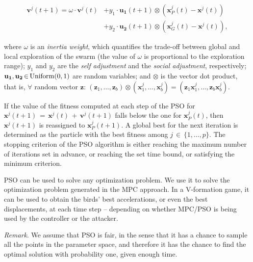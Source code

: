 \vspace*{-4mm}
\begin{align}
\mathbf{v}^j(t+1) = \omega\cdot\mathbf{v}^j(t) &+ y_1\cdot \mathbf{u_1}(t+1)\otimes(\mathbf{x}_{P}^j(t)-\mathbf{x}^j(t))  \nonumber \\
&+ y_2\cdot \mathbf{u_2}(t+1)\otimes(\mathbf{x}_{G}^j(t)-\mathbf{x}^j(t)),
\label{eq:swarm}
\end{align}

\vspace*{-1mm}\noindent{}where $\omega$ is an \emph{inertia weight}, which quantifies the trade-off between global and local exploration of the swarm (the value of $\omega$ is proportional to the exploration range); $y_1$ and $y_2$ are the \emph{self adjustment} and the \emph{social adjustment}, respectively; $\mathbf{u_1},\mathbf{u_2}\,{\in}\,{\rm Uniform}(0,1)$ are random variables; and $\otimes$ is the vector dot product, that is, $\forall$ random vector $\mathbf{z}$: $(\mathbf{z}_1,\ldots,\mathbf{z}_b)\otimes(\mathbf{x}_1^j,\ldots,\mathbf{x}_b^j)=(\mathbf{z}_1\mathbf{x}_1^j,\ldots,\mathbf{z}_b\mathbf{x}_b^j)$.


If the value of the fitness computed at each step of the PSO
for $\mathbf{x}^j(t+1)\,{=}\,\mathbf{x}^j(t)\,{+}\,\mathbf{v}^j(t+1)$ falls below the one for $\mathbf{x}_{P}^j(t)$, then $\mathbf{x}^j(t+1)$ is reassigned to $\mathbf{x}_{P}^j(t+1)$. A global best for the next iteration is determined as the particle with the best fitness among $j\,{\in}\,\{1,\ldots,p\}$. The stopping criterion of the PSO algorithm is either reaching the maximum number of iterations set in advance, or reaching the set time bound, or satisfying the minimum criterion. 

PSO can be used to solve any optimization problem. We use it to solve the optimization problem generated in the MPC approach. In a V-formation game, it can be used to obtain the birds' best accelerations, or even the best displacements, at each time step -- depending on whether MPC/PSO is being used by the controller or the attacker.

\emph{Remark}. We assume that PSO is fair, in the sense that it has a chance to sample all the points in the parameter space, and therefore it has the chance to find the optimal solution with probability one, given enough time.



